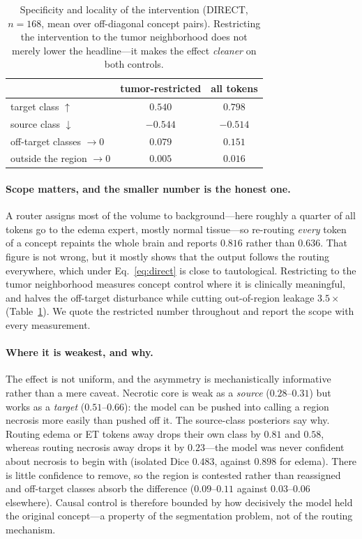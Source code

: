 \begin{table}[t]\centering\footnotesize
\setlength{\tabcolsep}{4pt}
\caption{Specificity and locality of the intervention (DIRECT, $n{=}168$, mean over off-diagonal
concept pairs). Restricting the intervention to the tumor neighborhood does not merely lower the
headline---it makes the effect \emph{cleaner} on both controls.}
\label{tab:specificity}
\begin{tabular}{lcc}
\toprule
& tumor-restricted & all tokens \\
\midrule
target class $\uparrow$              & $\mathbf{0.540}$ & $0.798$ \\
source class $\downarrow$            & $-0.544$ & $-0.514$ \\
off-target classes $\to 0$           & $\mathbf{0.079}$ & $0.151$ \\
outside the region $\to 0$           & $\mathbf{0.005}$ & $0.016$ \\
\bottomrule
\end{tabular}
\end{table}

\paragraph{Scope matters, and the smaller number is the honest one.}
A router assigns most of the volume to background---here roughly a quarter of all tokens go to
the edema expert, mostly normal tissue---so re-routing \emph{every} token of a concept repaints
the whole brain and reports $0.816$ rather than $0.636$. That figure is not wrong, but it mostly
shows that the output follows the routing everywhere, which under Eq.~\ref{eq:direct} is close to
tautological. Restricting to the tumor neighborhood measures concept control where it is
clinically meaningful, and halves the off-target disturbance while cutting out-of-region leakage
$3.5\times$ (Table~\ref{tab:specificity}). We quote the restricted number throughout and report
the scope with every measurement.

\paragraph{Where it is weakest, and why.}
The effect is not uniform, and the asymmetry is mechanistically informative rather than a mere
caveat. Necrotic core is weak as a \emph{source} ($0.28$--$0.31$) but works as a \emph{target}
($0.51$--$0.66$): the model can be pushed into calling a region necrosis more easily than pushed
off it. The source-class posteriors say why. Routing edema or ET tokens away drops their own class
by $0.81$ and $0.58$, whereas routing necrosis away drops it by $0.23$---the model was never
confident about necrosis to begin with (isolated Dice $0.483$, against $0.898$ for edema). There
is little confidence to remove, so the region is contested rather than reassigned and off-target
classes absorb the difference ($0.09$--$0.11$ against $0.03$--$0.06$ elsewhere). Causal control is
therefore bounded by how decisively the model held the original concept---a property of the
segmentation problem, not of the routing mechanism.

